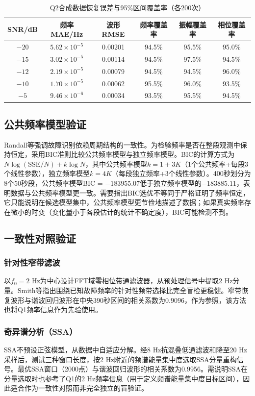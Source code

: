 \documentclass[withoutpreface,bwprint]{cumcmthesis}
\begin{document}
\begin{longtable}{cccccc}
    \caption{Q2合成数据恢复误差与95\%区间覆盖率（各200次）}\label{tab:q2_sim_error}\\
    \toprule
    SNR/dB & 频率MAE/Hz & 波形RMSE & 频率覆盖率 & 振幅覆盖率 & 相位覆盖率 \\
    \midrule
    $-20$ & $5.62\times10^{-5}$ & 0.00201 & 94.5\% & 95.5\% & 95.0\% \\
    $-15$ & $3.02\times10^{-5}$ & 0.00114 & 94.5\% & 97.5\% & 94.5\% \\
    $-12$ & $2.19\times10^{-5}$ & 0.00079 & 94.5\% & 94.5\% & 96.0\% \\
    $-10$ & $1.70\times10^{-5}$ & 0.00062 & 95.5\% & 96.0\% & 93.5\% \\
    $-5$  & $9.46\times10^{-6}$ & 0.00034 & 93.5\% & 95.5\% & 94.5\% \\
    \bottomrule
\end{longtable}

\subsection{公共频率模型验证}
Randall等强调故障识别依赖周期结构的一致性。为检验频率是否在整段观测中保持恒定，采用BIC准则比较公共频率模型与独立频率模型。BIC的计算方式为$N\log(\text{SSE}/N) + k\log N$，其中公共频率模型$k=1+3K$（1个公共频率+每段3个线性参数），独立频率模型$k=4K$（每段独立频率+3个线性参数）。400秒划分为8个50秒段，公共频率模型BIC = $-183955.07$低于独立频率模型的$-183885.11$，表明数据与公共频率模型更一致。需要指出BIC选优不等同于严格证明了频率恒定，它只能说明在候选模型集中，公共频率模型更节俭地描述了数据；如果真实频率存在微小的时变（变化量小于各段估计的统计不确定度），BIC可能检测不到。

\subsection{一致性对照验证}
\subsubsection{针对性窄带滤波}
以$f_0=2$ Hz为中心设计FFT域零相位带通滤波器，从预处理信号中提取2 Hz分量。Smith等指出围绕已知故障频率的针对性频带选择比完全盲检更稳健。窄带恢复波形与谐波回归波形在中央390秒区间的相关系数为$0.9096$，作为参照，该方法也将Q1频率信息作为先验使用。

\subsubsection{奇异谱分析（SSA）}
SSA不预设正弦模型，从数据中自适应分解。经8 Hz抗混叠低通滤波和降至20 Hz采样后，测试三种窗口长度，按2 Hz附近的频谱能量集中度选取SSA分量重构信号。最优SSA窗口（2000点）与谐波回归波形的相关系数为0.9956。需说明SSA在分量选取时也参考了Q1的2 Hz频率信息（用于定义频谱能量集中度目标区间），因此适合作为一致性对照而非完全独立的盲验证。
\end{document}
